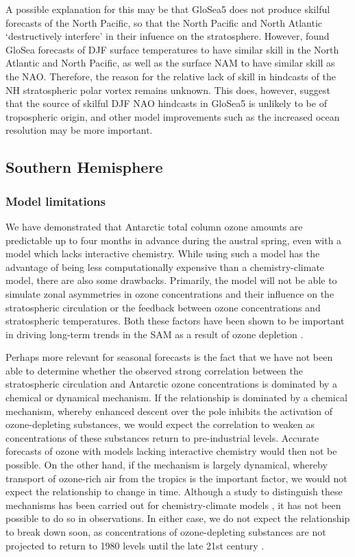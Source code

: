A possible explanation for this may be that GloSea5 does not produce skilful
forecasts of the North Pacific, so that the North Pacific and North Atlantic
`destructively interfere' in their infuence on the stratosphere. However,
\citet{MacLachlan2014} found GloSea forecasts of DJF surface temperatures to
have similar skill in the North Atlantic and North Pacific, as well as the
surface NAM to have similar skill as the NAO. Therefore, the reason for the
relative lack of skill in hindcasts of the NH stratospheric polar vortex remains
unknown. This does, however, suggest that the source of skilful DJF NAO
hindcasts in GloSea5 is unlikely to be of tropospheric origin, and other model
improvements such as the increased ocean resolution may be more important.


\subsection{Southern Hemisphere}
\subsubsection{Model limitations}

We have demonstrated that Antarctic total column ozone amounts are predictable
up to four months in advance during the austral spring, even with a model which
lacks interactive chemistry. While using such a model has the advantage of being
less computationally expensive than a chemistry-climate model, there are also
some drawbacks. Primarily, the model will not be able to simulate zonal
asymmetries in ozone concentrations and their influence on the stratospheric
circulation or the feedback between ozone concentrations and stratospheric
temperatures. Both these factors have been shown to be important in driving
long-term trends in the SAM as a result of ozone depletion \citep{Thompson2002a,
  Crook2008, Waugh2009}.

Perhaps more relevant for seasonal forecasts is the fact that we have not been
able to determine whether the observed strong correlation between the
stratospheric circulation and Antarctic ozone concentrations is dominated by a
chemical or dynamical mechanism. If the relationship is dominated by a chemical
mechanism, whereby enhanced descent over the pole inhibits the activation of
ozone-depleting substances, we would expect the correlation to weaken as
concentrations of these substances return to pre-industrial levels. Accurate
forecasts of ozone with models lacking interactive chemistry would then not be
possible. On the other hand, if the mechanism is largely dynamical, whereby
transport of ozone-rich air from the tropics is the important factor, we would
not expect the relationship to change in time.  Although a study to distinguish
these mechanisms has been carried out for chemistry-climate models
\citep{Garny2011}, it has not been possible to do so in observations. In either
case, we do not expect the relationship to break down soon, as concentrations of
ozone-depleting substances are not projected to return to 1980 levels until the
late 21st century \citep{WMO2010}.

